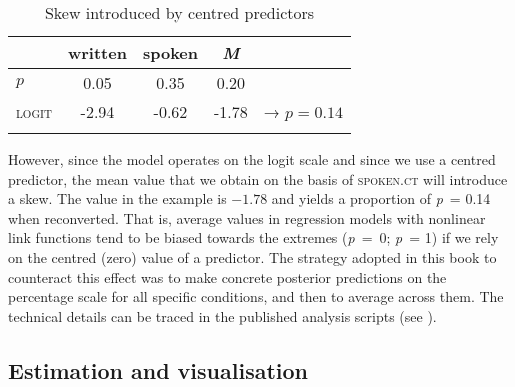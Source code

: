\begin{table}
\caption{\label{bkm:Ref74562473}\label{tab:6.2}Skew introduced by centred predictors}
\begin{tabular}{l *3{S[table-format=-1.2]} c}
\lsptoprule
                    & {written} & {spoken} &  {\textit{M}}  & \\\midrule
$p$            & 0.05 & 0.35  & 0.20 &   \\
\textsc{logit} & -2.94 & -0.62  & -1.78 & → $p=0.14$\\
\lspbottomrule
\end{tabular}
\end{table}

However, since the model operates on the logit scale and since we use a centred predictor, the mean value that we obtain on the basis of \textsc{spoken.ct} will introduce a skew. The value in the example is $-1.78$ and yields a proportion of \textit{p}~= 0.14 when reconverted. That is, average values in regression models with nonlinear link functions tend to be biased towards the extremes (\textit{p}~=~0; \textit{p}~= 1) if we rely on the centred (zero) value of a predictor. The strategy adopted in this book to counteract this effect was to make concrete posterior predictions on the percentage scale for all specific conditions, and then to average across them. The technical details can be traced in the published analysis scripts (see ).

\subsection{\label{bkm:Ref74482113}Estimation and visualisation}\label{sec:6.3.5}

